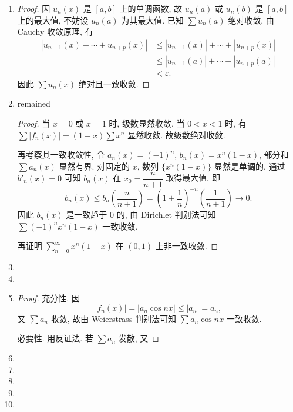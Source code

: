 \documentclass[a4paper, 11pt]{ctexart}
\begin{document}
\begin{enumerate}
        \begin{proof}
            因 $1 \leq e^x\ (x \in [0, +\infty))$, 故 $0 < 1/e^x \leq 1$, 因此 $(1/e^x)^n$ 单调且一致有界.
            由 Abel 判别法可知 $\sum{a_ne^{-nx}}$ 一致收敛.
        \end{proof}
    \item %
        \begin{proof}
            因 $u_n(x)$ 是 $[a, b]$ 上的单调函数, 故 $u_n(a)$ 或 $u_n(b)$ 是 $[a, b]$ 上的最大值, 不妨设 $u_n(a)$ 为其最大值.
            已知 $\sum{u_n(a)}$ 绝对收敛, 由 Cauchy 收敛原理, 有
            \begin{align*}
                |u_{n+1}(x) + \cdots + u_{n+p}(x)| &\leq |u_{n+1}(x)| + \cdots + |u_{n+p}(x)| \\
                &\leq |u_{n+1}(a)| + \cdots + |u_{n+p}(a)| \\
                &< \varepsilon.
            \end{align*}
            因此 $\sum{u_n(x)}$ 绝对且一致收敛.
        \end{proof}
    \item %
        {\color{red}remained}
        \begin{proof}
            当 $x=0$ 或 $x=1$ 时, 级数显然收敛. 当 $0 < x < 1$ 时, 有 $\sum|f_n(x)| = (1-x)\sum{x^n}$ 显然收敛.
            故级数绝对收敛.
            
            再考察其一致收敛性, 令 $a_n(x) = (-1)^n$, $b_n(x) = x^n(1-x)$, 部分和 $\sum a_n(x)$ 显然有界. 对固定的 $x$, 数列 $\{x^n(1-x)\}$ 显然是单调的,
            通过 $b'_n(x) = 0$ 可知 $b_n(x)$ 在 $x_0 = \dfrac{n}{n+1}$ 取得最大值, 即
            \[
                b_n(x) \leq b_n\left(\frac{n}{n+1}\right) = \left(1+\frac1n\right)^{-n}\left(\frac{1}{n+1}\right) \to 0.    
            \]
            因此 $b_n(x)$ 是一致趋于 $0$ 的, 由 Dirichlet 判别法可知 $\sum(-1)^nx^n(1-x)$ 一致收敛.

            再证明 $\sum\limits_{n=0}^\infty x^n(1-x)$ 在 $(0, 1)$ 上非一致收敛.
        \end{proof}
    \item %
    \item %
    \item %
        \begin{proof}
            充分性. 因
            \[
                |f_n(x)| = |a_n\cos{nx}| \leq |a_n| = a_n,    
            \]
            又 $\sum{a_n}$ 收敛, 故由 Weierstrass 判别法可知 $\sum{a_n\cos{nx}}$ 一致收敛.

            必要性. 用反证法. 若 $\sum{a_n}$ 发散, 又
        \end{proof}
    \item %
    \item %
    \item %
    \item %
    \item %
\end{enumerate}
\end{document}
